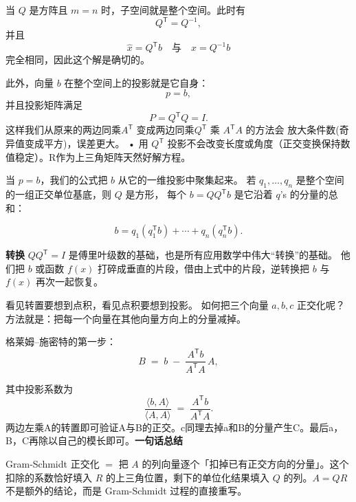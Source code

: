 \begin{proposition}
当 $Q$ 是方阵且 $m=n$ 时，子空间就是整个空间。此时有
\[
Q^{\mathsf T} = Q^{-1},
\]
并且
\[
\hat{x} = Q^{\mathsf T} b \quad \text{与} \quad x = Q^{-1} b
\]
完全相同，因此这个解是确切的。

此外，向量 $b$ 在整个空间上的投影就是它自身：
\[
p = b,
\]
并且投影矩阵满足
\[
P = Q^{\mathsf T} Q = I.
\]
这样我们从原来的两边同乘$A^{\mathsf T}$ 变成两边同乘$Q^{\mathsf T}$
	乘 $A^{\mathsf T}A$ 的方法会 放大条件数(奇异值变成平方)，误差更大。
	•	用 $Q^{\mathsf T}$ 投影不会改变长度或角度（正交变换保持数值稳定）。R作为上三角矩阵天然好解方程。
\end{proposition}
\begin{proposition}[正交矩阵与傅立叶变换]
    当 $p=b$，我们的公式把 $b$ 从它的一维投影中聚集起来。
若 $q_1,\dots,q_n$ 是整个空间的一组正交单位基底，则 $Q$ 是方形，
每个 $b=QQ^{\mathsf T}b$ 是它沿着 $q$'s 的分量的总和：

\[
b = q_1(q_1^{\mathsf T} b) + \cdots + q_n(q_n^{\mathsf T} b).
\]

\noindent
\textbf{转换} $QQ^{\mathsf T}=I$ 是傅里叶级数的基础，也是所有应用数学中伟大“转换”的基础。
他们把 $b$ 或函数 $f(x)$ 打碎成垂直的片段，借由上式中的片段，逆转换把 $b$ 与 $f(x)$ 再次一起恢复。
\end{proposition}
\begin{dxtips}[施密特正交化]
    看见转置要想到点积，看见点积要想到投影。  
    如何把三个向量 $a,b,c$ 正交化呢？  
    方法就是：把每一个向量在其他向量方向上的分量减掉。  

    \medskip
    格莱姆–施密特的第一步：
    \[
        B \;=\; b \;-\; \frac{A^{\mathsf T} b}{A^{\mathsf T} A} \, A,
        \tag{7}
    \]

    其中投影系数为
    \[
        \frac{\langle b, A \rangle}{\langle A, A \rangle}
        \;=\;
        \frac{A^{\mathsf T} b}{A^{\mathsf T} A}.
    \]
    两边左乘A的转置即可验证A与B的正交。c同理去掉a和B的分量产生C。最后a，B，C再除以自己的模长即可。\textbf{一句话总结}

Gram-Schmidt 正交化 $=$ 把 $A$ 的列向量逐个「扣掉已有正交方向的分量」。这个扣除的系数恰好填入 $R$ 的上三角位置，剩下的单位化结果填入 $Q$ 的列。$A = QR$ 不是额外的结论，而是 Gram-Schmidt 过程的直接重写。
\end{dxtips}
